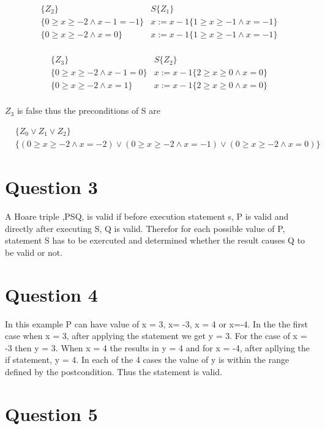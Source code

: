 \documentclass[10pt,a4paper]{article}
\begin{document}
\begin{equation}
\begin{split}
 \{Z_2\}&S\{Z_1\}\\
  \{  0 \geq x \geq -2\wedge x-1=-1\}&x:=x-1\{ 1 \geq x \geq -1\wedge x=-1\}\\
    \{  0 \geq x \geq -2\wedge x=0\}&x:=x-1\{ 1 \geq x \geq -1\wedge x=-1\}\\
\end{split}
  \end{equation} 

  
\begin{equation}
\begin{split}
 \{Z_3\}&S\{Z_2\}\\
  \{  0 \geq x \geq -2\wedge x-1=0\}&x:=x-1 \{ 2 \geq x \geq 0\wedge x=0\}\\
    \{ 0 \geq x \geq -2\wedge x=1\}&x:=x-1 \{ 2 \geq x \geq 0\wedge x=0\}\\
\end{split}
  \end{equation} 


$Z_3$ is false thus the preconditions of S are

\begin{equation}
\begin{split}
 &\{Z_0 \vee Z_1 \vee Z_2\}\\
 &\{(0 \geq x \geq -2\wedge x=-2)\vee (0 \geq x \geq -2\wedge x=-1)\vee( 0 \geq x \geq -2\wedge x=0)\}
 \end{split}
\end{equation}

\section{Question 3}

A Hoare triple ,{P}S{Q}, is valid if before execution statement s, P is valid and directly after executing S, Q is valid. Therefor for each possible value of P, statement S has to be exercuted and determined whether the result causes Q to be valid or not.  

\section{Question 4}

In this example P can have value of  x = 3, x= -3, x = 4 or x=-4. In the the first case when x = 3, after applying the statement we get y = 3. For the case of x = -3 then y = 3. When x = 4 the results in y = 4 and for x = -4, after apllying the if statement, y = 4. In each of the 4 cases the value of y is within the range defined by the postcondition. Thus the statement is valid.   

\section{Question 5}
\end{document}
